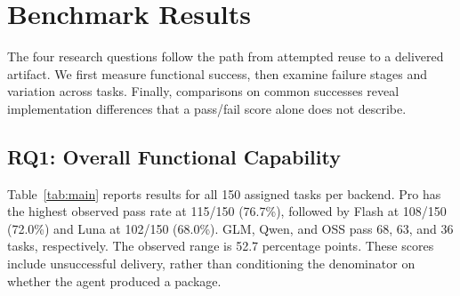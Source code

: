 \documentclass[acmsmall,screen,review,anonymous,nonacm]{acmart}
\begin{document}
\section{Benchmark Results}
\label{sec:results}

The four research questions follow the path from attempted reuse to a delivered
artifact. We first measure functional success, then examine failure stages and
variation across tasks. Finally, comparisons on common successes reveal
implementation differences that a pass/fail score alone does not describe.

\subsection{RQ1: Overall Functional Capability}
\label{sec:rq1}

Table~\ref{tab:main} reports results for all 150 assigned tasks per backend.
Pro has the highest observed pass rate at 115/150 (76.7\%), followed by Flash
at 108/150 (72.0\%) and Luna at 102/150 (68.0\%). GLM, Qwen, and OSS pass
68, 63, and 36 tasks, respectively. The observed range is 52.7 percentage
points. These scores include unsuccessful delivery, rather than conditioning
the denominator on whether the agent produced a package.
\end{document}
